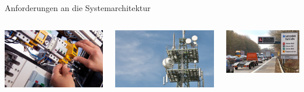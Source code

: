 {\begin{frame}{Anforderungen an die Systemarchitektur}
    \bigskip

    \begin{columns}[onlytextwidth]
        \includegraphics[width=\textwidth]{06-architektur/img/anforderungen1}

        \includegraphics[width=\textwidth]{06-architektur/img/anforderungen2}

        \includegraphics[width=\textwidth]{06-architektur/img/anforderungen3}
    \end{columns}


\end{frame}}
